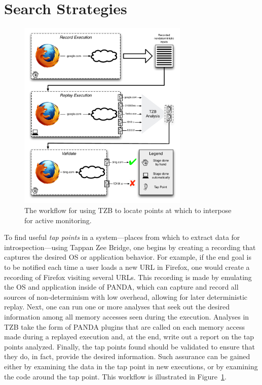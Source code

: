 \section{Search Strategies}
\label{sec:technical}

\begin{figure}
    \begin{center}
        \includegraphics[width=3.2in]{figures/tzbarch.pdf}
    \end{center}
    \caption{The workflow for using TZB to locate points at which to
    interpose for active monitoring.}
    \label{fig:workflow}
\end{figure}

To find useful \emph{tap points} in a system---places from which to
extract data for introspection---using Tappan Zee Bridge, one begins by
creating a recording that captures the desired OS or application
behavior. For example, if the end goal is to be notified each time a
user loads a new URL in Firefox, one would create a recording of Firefox
visiting several URLs. This recording is made by emulating the OS and
application inside of PANDA, which can capture and record all sources of
non-determinism with low overhead, allowing for later deterministic
replay. Next, one can run one or more analyses that seek out the desired
information among all memory accesses seen during the execution.
Analyses in TZB take the form of PANDA plugins that are called on each
memory access made during a replayed execution and, at the end, write
out a report on the tap points analyzed. Finally, the tap points found
should be validated to ensure that they do, in fact, provide the desired
information. Such assurance can be gained either by examining the data
in the tap point in new executions, or by examining the code around the
tap point. This workflow is illustrated in Figure~\ref{fig:workflow}.

